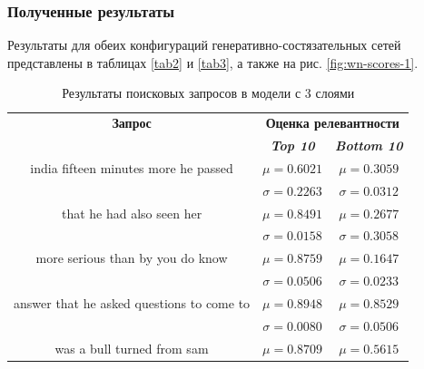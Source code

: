 \subsubsection{Полученные результаты}
Результаты для обеих конфигураций генеративно-состязательных сетей представлены в таблицах \ref{tab2} и \ref{tab3}, а также на рис. \ref{fig:wn-scores-1}.
\begin{table}[tbp]
    \caption{Результаты поисковых запросов в модели с 3 слоями}
    \begin{center}
        \begin{tabular}{ccc}
            \toprule
            \textbf{Запрос}                           & \multicolumn{2}{c}{\textbf{Оценка релевантности}}                               \\
                                                      & \textbf{\textit{Top 10}}                          & \textbf{\textit{Bottom 10}} \\
            \midrule
            india  fifteen minutes more he passed     & \(\mu=0.6021\)                                    & \(\mu=0.3059\)              \\
                                                      & \(\sigma=0.2263\)                                 & \(\sigma=0.0312\)           \\
            \midrule
            that he had also seen her                 & \(\mu=0.8491\)                                    & \(\mu=0.2677\)              \\
                                                      & \(\sigma=0.0158\)                                 & \(\sigma=0.3058\)           \\
            \midrule
            more serious than by you do know          & \(\mu=0.8759\)                                    & \(\mu=0.1647\)              \\
                                                      & \(\sigma=0.0506\)                                 & \(\sigma=0.0233\)           \\
            \midrule
            answer that he asked questions to come to & \(\mu=0.8948\)                                    & \(\mu=0.8529\)              \\
                                                      & \(\sigma=0.0080\)                                 & \(\sigma=0.0506\)           \\
            \midrule
            was a bull turned from sam                & \(\mu=0.8709\)                                    & \(\mu=0.5615\)              \\

\end{tabular}
\end{center}
\end{table}
